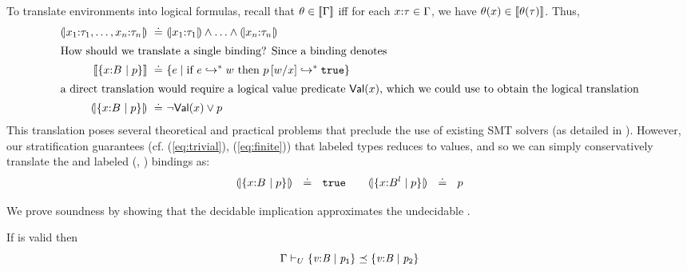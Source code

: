 To translate environments into logical formulas, recall that $\theta \in [\![\Gamma]\!]$
iff for each ${x} \text{:} {\ensuremath{\mathit{\tau}}} \in \Gamma$, we have 
$\theta(x) \in [\![\theta(\mathit{\tau})]\!]$. Thus, 
%
\begin{align*}
\embed{\tbind{x_1}{\typ_1},\ldots,\tbind{x_n}{\typ_n}} \defeq &
  \embed{\tbind{x_1}{\typ_1}} \wedge \ldots \wedge \embed{\tbind{x_n}{\typ_n}}\\
\intertext{How should we translate a single binding? Since a binding denotes}
\interp{\tref{x}{\tbase}{}{p}} \defeq &
  \{ e \mid \mbox{if } \evals{e}{w}\ \mbox{then}\ \evals{\SUBST{p}{x}{w}}{\etrue} \}\\
\intertext{a direct translation would require a logical value 
  predicate $\isvalue{x}$, which we could use to obtain the logical 
  translation}
\embed{\tref{x}{\tbase}{}{p}} \defeq & \lnot \isvalue{x} \vee p
\end{align*}
%
This translation poses several theoretical and 
practical problems that preclude the use of existing 
SMT solvers (as detailed in ). 
However, our stratification guarantees 
(cf. (\ref{eq:trivial}), (\ref{eq:finite}))
that labeled types reduces to values, and 
so we can simply conservatively translate 
the \Div and labeled (\Wnf, \Fin) bindings as:
$$(\!|\{ {x} \text{:} {B^{}} \mid p \}|\!)\ \ \doteq\ \ \mathtt{true} \qquad  (\!|\{ {x} \text{:} {B^{l}} \mid p \}|\!)\ \ \doteq\ \ p$$


 We prove soundness by showing that
the decidable implication \rtdimp approximates 
the undecidable \rimpl. 

\begin{theorem}{}\label{thm:approximation} If  is
  valid then 
  $$\undecissubtype{\Env}{\ttreft{\vv}{\Base}{\p_1}}{\ttreft{\vv}{\Base}{\p_2}}$$
\end{theorem}


